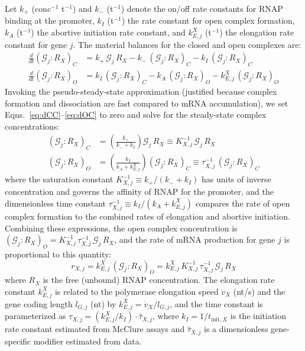 Let $k_+$ (conc$^{-1}$ t$^{-1}$) and $k_-$ (t$^{-1}$) denote the on/off rate constants for RNAP binding at the promoter, $k_I$ (t$^{-1}$) the rate constant for open complex formation, $k_A$ (t$^{-1}$) the abortive initiation rate constant, and $k_{E,j}^X$ (t$^{-1}$) the elongation rate constant for gene $j$. The material balances for the closed and open complexes are:
\begin{align}
\frac{d}{dt}(\mathcal{G}_j : R_X)_C &= k_+\,\mathcal{G}_j\,R_X - k_-\,(\mathcal{G}_j : R_X)_C - k_I\,(\mathcal{G}_j : R_X)_C \label{eq:dCC} \\
\frac{d}{dt}(\mathcal{G}_j : R_X)_O &= k_I\,(\mathcal{G}_j : R_X)_C - k_A\,(\mathcal{G}_j : R_X)_O - k_{E,j}^X\,(\mathcal{G}_j : R_X)_O \label{eq:dOC}
\end{align}
Invoking the pseudo-steady-state approximation (justified because complex formation and dissociation are fast compared to mRNA accumulation), we set Eqns.~\ref{eq:dCC}--\ref{eq:dOC} to zero and solve for the steady-state complex concentrations:
\begin{align}
(\mathcal{G}_j : R_X)_C &= \left(\frac{k_+}{k_- + k_I}\right)\mathcal{G}_j\,R_X \equiv K_{X,j}^{-1}\,\mathcal{G}_j\,R_X \label{eq:CC_ss} \\
(\mathcal{G}_j : R_X)_O &= \left(\frac{k_I}{k_A + k_{E,j}^X}\right)(\mathcal{G}_j : R_X)_C \equiv \tau_{X,j}^{-1}\,(\mathcal{G}_j : R_X)_C \label{eq:OC_ss}
\end{align}
where the saturation constant $K_{X,j}^{-1} \equiv k_+/(k_- + k_I)$ has units of inverse concentration and governs the affinity of RNAP for the promoter, and the dimensionless time constant $\tau_{X,j}^{-1} \equiv k_I/(k_A + k_{E,j}^X)$ compares the rate of open complex formation to the combined rates of elongation and abortive initiation. Combining these expressions, the open complex concentration is $(\mathcal{G}_j : R_X)_O = K_{X,j}^{-1}\,\tau_{X,j}^{-1}\,\mathcal{G}_j\,R_X$, and the rate of mRNA production for gene $j$ is proportional to this quantity:
\begin{equation}
\boxed{r_{X,j} = k_{E,j}^X\,(\mathcal{G}_j : R_X)_O = k_{E,j}^X\,K_{X,j}^{-1}\,\tau_{X,j}^{-1}\,\mathcal{G}_j\,R_X}
\label{eq:rX_general}
\end{equation}
where $R_X$ is the free (unbound) RNAP concentration. The elongation rate constant $k_{E,j}^X$ is related to the polymerase elongation speed $\dot{v}_X$ (nt/s) and the gene coding length $l_{G,j}$ (nt) by $k_{E,j}^X = \dot{v}_X/l_{G,j}$, and the time constant is parameterized as $\tau_{X,j} = (k_{E,j}^X/k_I)\cdot\hat{\tau}_{X,j}$, where $k_I = 1/t_{\text{init},X}$ is the initiation rate constant estimated from McClure assays \cite{mcclure_1980} and $\hat{\tau}_{X,j}$ is a dimensionless gene-specific modifier estimated from data.


